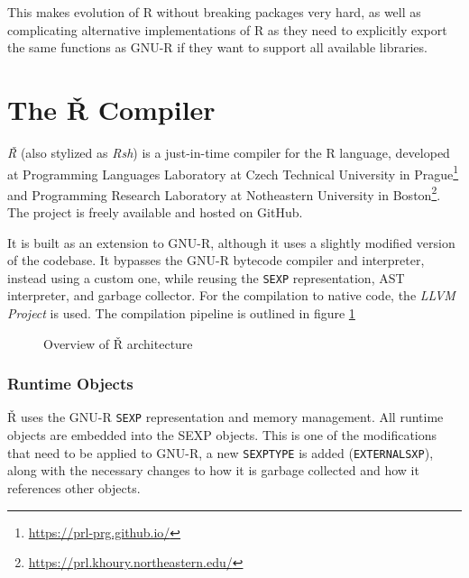 This makes evolution of R without breaking packages very hard, as well as complicating alternative implementations of R as they need to explicitly export the same functions as GNU-R if they want to support all available libraries.

\newpage
\section{The Ř Compiler}

\textit{Ř} (also stylized as \textit{Rsh}) is a just-in-time compiler for the R language, developed at Programming Languages Laboratory at Czech Technical University in Prague\footnote{\url{https://prl-prg.github.io/}} and Programming Research Laboratory at Notheastern University in Boston\footnote{\url{https://prl.khoury.northeastern.edu/}}. The project is freely available and hosted on GitHub\cite{rsh-github}.

It is built as an extension to GNU-R, although it uses a slightly modified version of the codebase. It bypasses the GNU-R bytecode compiler and interpreter, instead using a custom one, while reusing the \texttt{SEXP} representation, AST interpreter, and garbage collector. For the compilation to native code, the \textit{LLVM Project}\cite{llvm} is used. The compilation pipeline is outlined in figure \ref{fig:rsh-archit}

\begin{figure}
	\centering
	\caption{Overview of Ř architecture\cite{reusing-jit}}\label{fig:rsh-archit}
\end{figure}

\subsubsection*{Runtime Objects}
Ř uses the GNU-R \texttt{SEXP} representation and memory management. All runtime objects are embedded into the SEXP objects. This is one of the modifications that need to be applied to GNU-R, a new \texttt{SEXPTYPE} is added (\texttt{EXTERNALSXP}), along with the necessary changes to how it is garbage collected and how it references other objects.

